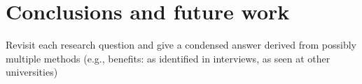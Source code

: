 \chapter{Conclusions and future work}
Revisit each research question and give a condensed answer derived from possibly multiple methods (e.g., benefits: as identified in interviews, as seen at other universities)